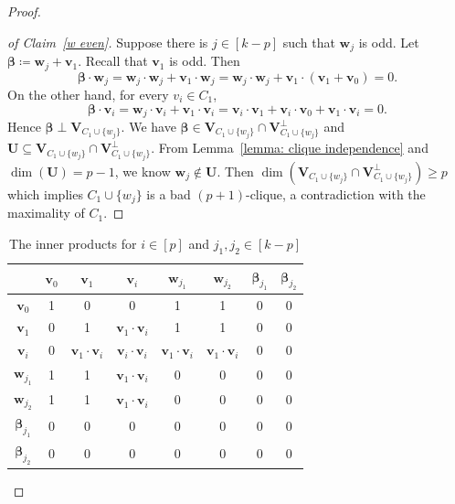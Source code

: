 \documentclass[10pt,a4paper]{amsart}
\begin{document}
\begin{proof}
\begin{proof}[of Claim~\ref{w even}]
Suppose there is $j\in[k-p]$ such that $\textbf{w}_j$ is odd. Let  $\boldsymbol{\beta} \coloneqq \textbf{w}_j+\textbf{v}_1$. Recall that $\textbf{v}_1$ is odd.
Then 
\[
    \boldsymbol{\beta} \cdot \textbf{w}_j=\textbf{w}_j\cdot \textbf{w}_j+\textbf{v}_1\cdot \textbf{w}_j=\textbf{w}_j\cdot \textbf{w}_j+\textbf{v}_1\cdot (\textbf{v}_1+ \textbf{v}_0)=0.
\]
On the other hand, for every $v_i\in C_1$, 
\[
    \boldsymbol{\beta} \cdot \textbf{v}_i=\textbf{w}_j\cdot \textbf{v}_i+\textbf{v}_1\cdot \textbf{v}_i=\textbf{v}_i\cdot \textbf{v}_1+\textbf{v}_i\cdot \textbf{v}_0+\textbf{v}_1\cdot \textbf{v}_i=0.
\]
Hence $\boldsymbol{\beta} \perp \textbf{V}_{C_1\cup\{w_j\}}$. We have $\boldsymbol{\beta} \in \textbf{V}_{C_1\cup\{w_j\}}\cap \textbf{V}_{C_1\cup\{w_j\}}^{\perp}$ and $\textbf{U}\subseteq \textbf{V}_{C_1\cup\{w_j\}}\cap \textbf{V}_{C_1\cup\{w_j\}}^{\perp}$. From Lemma~\ref{lemma: clique independence} and $\dim(\textbf{U})= p-1$, we know $\textbf{w}_j \notin \textbf{U}$. Then $\dim(\textbf{V}_{C_1\cup\{w_j\}}\cap \textbf{V}_{C_1\cup\{w_j\}}^{\perp})\ge p$ which implies  $ C_1\cup \{w_j\}$ is a bad $(p+1)$-clique, a contradiction with the maximality of $C_1$.
\end{proof}

\vspace{.2cm}

\begin{table}
    \centering
    \begin{tabular}{|c|c|c|c|c|c|c|c|}
    \hline
         & $\textbf{v}_0$ & $\textbf{v}_1$  & $\textbf{v}_i$ & $\textbf{w}_{j_1}$ & $\textbf{w}_{j_2}$ & $\boldsymbol{\beta}_{j_1}$ &  $\boldsymbol{\beta}_{j_2}$\\
    \hline
        $\textbf{v}_0$ & 1 & 0 & 0 & 1 & 1 & 0 & 0\\
    \hline
        $\textbf{v}_1$ & 0 & 1 & $\textbf{v}_1\cdot \textbf{v}_i$ & 1 & 1 & 0 & 0\\
    \hline
        $\textbf{v}_i$ & 0 & $\textbf{v}_1\cdot \textbf{v}_i$ & $\textbf{v}_i\cdot \textbf{v}_i$ & $\textbf{v}_1\cdot \textbf{v}_i$ & $\textbf{v}_1\cdot \textbf{v}_i$ & 0 & 0\\
    \hline
        $\textbf{w}_{j_1}$ & 1 & 1 & $\textbf{v}_1\cdot \textbf{v}_i$ & 0 & 0 & 0 & 0\\
    \hline
        $\textbf{w}_{j_2}$ & 1 & 1 & $\textbf{v}_1\cdot \textbf{v}_i$ & 0 & 0 & 0 & 0\\
    \hline
        $\boldsymbol{\beta}_{j_1}$ & 0 & 0 & 0 & 0 & 0 & 0 & 0\\
    \hline
        $\boldsymbol{\beta}_{j_2}$ & 0 & 0 & 0 & 0 & 0 & 0 & 0\\
    \hline
    \end{tabular}
    \caption{The inner products for $i\in[p]$ and $j_1,j_2\in[k-p]$}\label{tab}
\end{table}


\end{proof}
\end{document}
